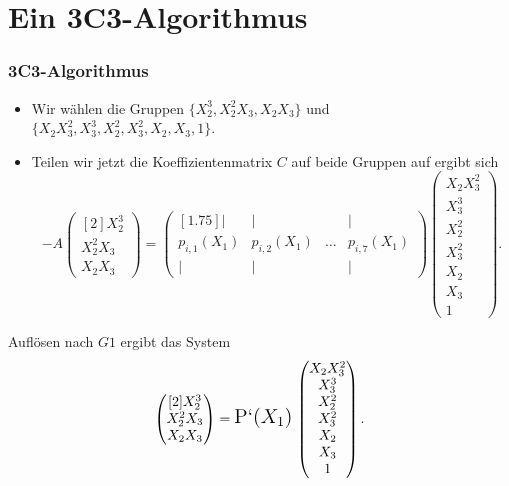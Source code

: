 \documentclass[11pt]{beamer}
\theoremstyle{custom}
\theoremstyle{custom}
\begin{document}
	\section{Ein 3C3-Algorithmus}
	\begin{frame}
		\frametitle{3C3-Algorithmus}
		\begin{itemize}
			\item Wir wählen die Gruppen $\{X_{2}^3,X_{2}^2X_{3},X_{2}X_{3}\}$ und $\{X_{2}X_{3}^2,X_{3}^3,X_{2}^2,X_{3}^2,X_{2},X_{3},1\}$.\\ \pause
			
			\item Teilen wir jetzt die Koeffizientenmatrix $C$ auf beide Gruppen auf ergibt sich 
			\begin{equation*}
				-A
				\begin{pmatrix}[2]
			X_{2}^3\\
X_{2}^2X_{3}\\
X_{2}X_{3}
				\end{pmatrix}
				=
				\begin{pmatrix}[1.75]
					\vert & \vert &   & \vert\\
					p_{i,1}(X_{1})&p_{i,2}(X_{1})& \ldots&p_{i,7}(X_{1})\\
					\vert & \vert & & \vert
				\end{pmatrix}
				\begin{pmatrix}
			X_{2}X_{3}^2\\
X_{3}^3\\
X_{2}^2\\
X_{3}^2\\
X_{2}\\
X_{3}\\
1
				\end{pmatrix}.
			\end{equation*}
		\end{itemize}
	\end{frame}
	\begin{frame}
		Auflösen nach $G1$ ergibt das System
		\begin{equation*}
			\begin{pmatrix}[2]
X_{2}^3\\
X_{2}^2X_{3}\\
X_{2}X_{3}
			\end{pmatrix}
			=
			{\Large \text{P`($X_1$)}} \,
			\begin{pmatrix}
			X_{2}X_{3}^2\\
X_{3}^3\\
X_{2}^2\\
X_{3}^2\\
X_{2}\\
X_{3}\\
1
			\end{pmatrix}.
		\end{equation*}
	\end{frame}
\end{document}

